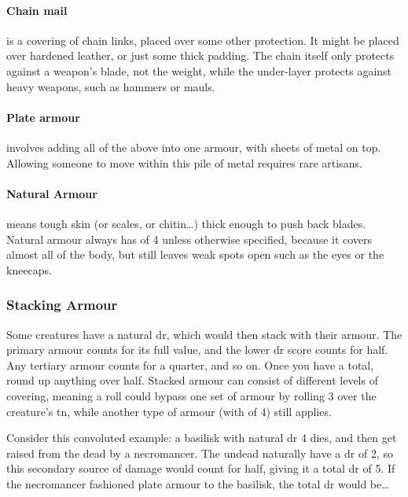 \begin{multicols}{2}
\paragraph{Chain mail}
is a covering of chain links, placed over some other protection.
It might be placed over hardened leather, or just some thick padding.
The chain itself only protects against a weapon's blade, not the weight, while the under-layer protects against heavy weapons, such as hammers or mauls.

\paragraph{Plate armour}
involves adding all of the above into one armour, with sheets of metal on top.
Allowing someone to move within this pile of metal requires rare artisans.


\paragraph{Natural Armour}
means tough skin (or scales, or chitin\ldots) thick enough to push back blades.
Natural armour always has  of 4 unless otherwise specified, because it covers almost all of the body, but still leaves weak spots open such as the eyes or the kneecaps.

\begin{figure*}[b!]
  \projectilesChart
\end{figure*}

\subsubsection{Stacking Armour}
\label{stackingarmour}

Some creatures have a natural \gls{dr}, which would then stack with their armour.
The primary armour counts for its full value, and the lower \gls{dr} score counts for half.
Any tertiary armour counts for a quarter, and so on.
Once you have a total, round up anything over half.
Stacked armour can consist of different levels of \gls{covering}, meaning a roll could bypass one set of armour by rolling 3 over the creature's \gls{tn}, while another type of armour (with  of 4) still applies.

Consider this convoluted example: a basilisk with natural \gls{dr} 4 dies, and then get raised from the dead by a necromancer.
The undead naturally have a \gls{dr} of 2, so this secondary source of damage would count for half, giving it a total \gls{dr} of 5.
If the necromancer fashioned plate armour to the basilisk, the total \gls{dr} would be\ldots


\end{multicols}
